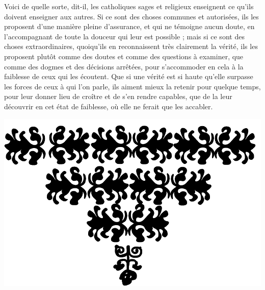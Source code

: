 Voici de quelle sorte, dit-il, les catholiques sages et religieux enseignent ce qu'ils doivent enseigner aux autres. Si ce sont des choses communes et autorisées, ils les proposent d'une manière pleine d'assurance, et qui ne témoigne aucun doute, en l'accompagnant de toute la douceur qui leur est possible ; mais si ce sont des choses extraordinaires, quoiqu'ils en reconnaissent très clairement la vérité, ils les proposent plutôt comme des doutes et comme des questions à examiner, que comme des dogmes et des décisions arrêtées, pour s'accommoder en cela à la faiblesse de ceux qui les écoutent. Que si une vérité est si haute qu'elle surpasse les forces de ceux à qui l'on parle, ils aiment mieux la retenir pour quelque temps, pour leur donner lieu de croître et de s'en rendre capables, que de la leur découvrir en cet état de faiblesse, où elle ne ferait que les accabler.

\begin{center}
	\includegraphics[scale=0.155]{images/fin-de-partie.png}
\end{center}

